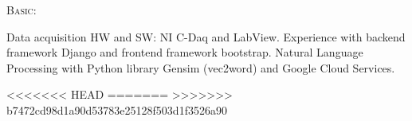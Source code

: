 \documentclass[10pt]{article}
\newcommand{\cvsection}[1]{\section*{\centering\normalsize\uppercase{#1}}\vspace{-16pt}\rule{\linewidth}{0.2pt}\vspace{6pt}}
\begin{document}
{\textsc{Basic:}\par}
Data acquisition HW and SW: NI C-Daq and LabView. Experience with backend framework Django and frontend framework bootstrap. Natural Language Processing with Python library Gensim (vec2word) and Google Cloud Services.



<<<<<<< HEAD
=======
>>>>>>> b7472cd98d1a90d53783e25128f503d1f3526a90


\end{document}
